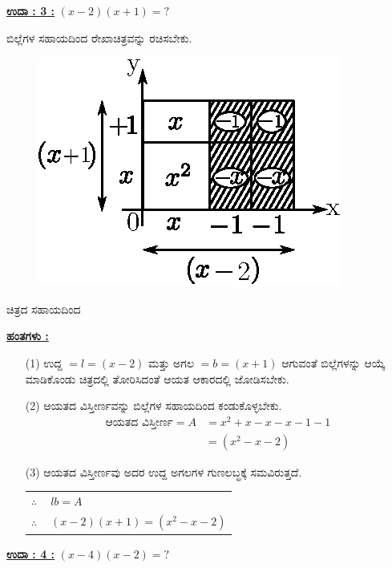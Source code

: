 \noindent
{\textbf{\underline{ಉದಾ : 3 :}}} $(x - 2)(x + 1) = ?$

ಬಿಲ್ಲೆಗಳ ಸಹಾಯದಿಂದ ರೇಖಾಚಿತ್ರವನ್ನು ರಚಿಸಬೇಕು.
\begin{figure}[H]
\centering
\includegraphics[scale=0.8]{src/figure/chap3/fig3-31c.eps}
\end{figure}
ಚಿತ್ರದ ಸಹಾಯದಿಂದ 

\noindent
{\textbf{\underline{ಹಂತಗಳು :}}}
\begin{itemize}
\item [(1)] ಉದ್ದ $= l = (x - 2)$ ಮತ್ತು ಅಗಲ $= b = (x + 1)$ ಆಗುವಂತೆ ಬಿಲ್ಲೆಗಳನ್ನು ಆಯ್ಕೆ ಮಾಡಿಕೊಂಡು ಚಿತ್ರದಲ್ಲಿ ತೋರಿಸಿದಂತೆ ಆಯತ ಆಕಾರದಲ್ಲಿ ಜೋಡಿಸಬೇಕು. 
\item [(2)] ಆಯತದ ವಿಸ್ತೀರ್ಣವನ್ನು ಬಿಲ್ಲೆಗಳ ಸಹಾಯದಿಂದ ಕಂಡುಕೊಳ್ಳಬೇಕು. 
\begin{align*}
\text{ಆಯತದ ವಿಸ್ತೀರ್ಣ}= A & = x^2 + x - x - x - 1 - 1\\
& = (x^2 - x - 2)
\end{align*}
\item [(3)] ಆಯತದ ವಿಸ್ತೀರ್ಣವು ಅದರ ಉದ್ದ ಅಗಲಗಳ ಗುಣಲಬ್ಧಕ್ಕೆ ಸಮವಿರುತ್ತದೆ.
\begin{tabular}{ll}
$\therefore~$ & $lb = A$\\
$\therefore~$ & $(x-2)(x+1) = (x^2-x-2)$
\end{tabular}

\end{itemize}

\medskip
\noindent
{\textbf{\underline{ಉದಾ : 4 :}}} $(x-4)(x-2) = ?$

